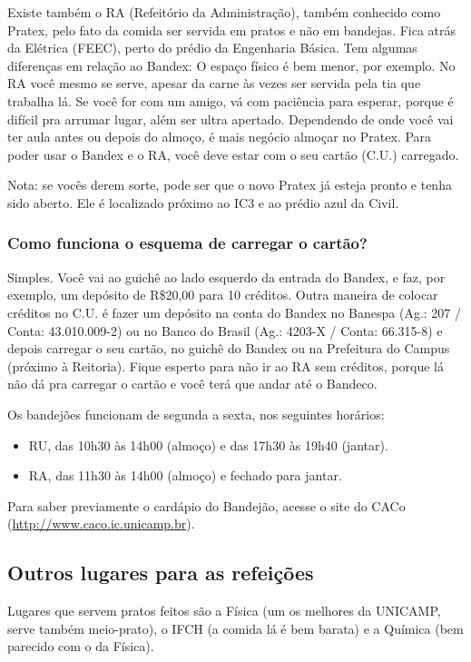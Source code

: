 Existe também o RA (Refeitório da Administração), também conhecido como Pratex,
pelo fato da comida ser servida em pratos e não em bandejas. Fica atrás da
Elétrica (FEEC), perto do prédio da Engenharia Básica. Tem algumas diferenças em
relação ao Bandex: O espaço físico é bem menor, por exemplo. No RA você mesmo se
serve, apesar da carne às vezes ser servida pela tia que trabalha lá. Se você
for com um amigo, vá com paciência para esperar, porque é difícil pra arrumar
lugar, além ser ultra apertado. Dependendo de onde você vai ter aula antes ou
depois do almoço, é mais negócio almoçar no Pratex. Para poder usar o Bandex
e o RA, você deve estar com o seu cartão (C.U.) carregado.

Nota: se vocês derem sorte, pode ser que o novo Pratex já esteja pronto e tenha
sido aberto. Ele é localizado próximo ao IC3 e ao prédio azul da Civil. 

\subsubsection{Como funciona o esquema de carregar o cartão?}
Simples. Você vai ao guichê ao lado esquerdo da entrada do Bandex, e faz, por
exemplo, um depósito de R\$20,00 para 10 créditos. Outra maneira de colocar
créditos no C.U. é fazer um depósito na conta do Bandex no Banespa (Ag.: 207
/ Conta: 43.010.009-2) ou no Banco do Brasil (Ag.: 4203-X / Conta: 66.315-8)
e depois carregar o seu cartão, no guichê do Bandex ou na Prefeitura do Campus
(próximo à Reitoria). Fique esperto para não ir ao RA sem créditos, porque lá
não dá pra carregar o cartão e você terá que andar até o Bandeco.

Os bandejões funcionam de segunda a sexta, nos seguintes horários:

\begin{itemize}
\item  RU, das 10h30 às 14h00 (almoço) e das 17h30 às 19h40 (jantar).
\item  RA, das 11h30 às 14h00 (almoço) e fechado para jantar.
\end{itemize}
Para saber previamente o cardápio do Bandejão, acesse o site do CACo (\url{http://www.caco.ic.unicamp.br}).

\subsection{Outros lugares para as refeições}

Lugares que servem pratos feitos são a Física (um os melhores da UNICAMP, serve
também meio-prato), o IFCH (a comida lá é bem barata) e a Química (bem parecido
com o da Física).

